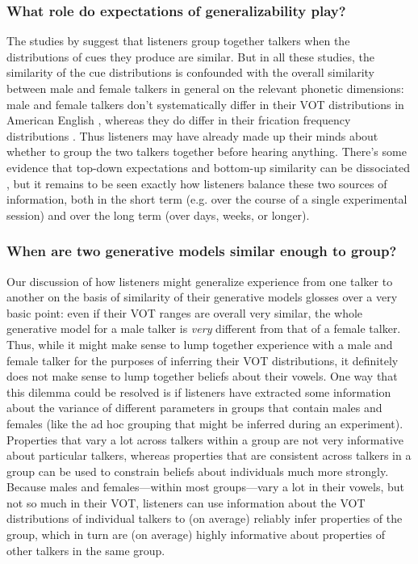 \subsubsection{What role do expectations of generalizability play?}
\label{sec:what-role-expect}

The studies by \textcite{Kraljic2005,Kraljic2006,Kraljic2007} suggest that listeners group together talkers when the distributions of cues they produce are similar.  But in all these studies, the similarity of the cue distributions is confounded with the overall similarity between male and female talkers in general on the relevant phonetic dimensions: male and female talkers don't systematically differ in their VOT distributions in American English \autocite{Allen2003}, whereas they do differ in their frication frequency distributions \autocite{Newman2001}.  Thus listeners may have already made up their minds about whether to group the two talkers together before hearing anything.  There's some evidence that top-down expectations and bottom-up similarity can be dissociated \autocite{Munson2011,Reinisch2014}, but it remains to be seen exactly how listeners balance these two sources of information, both in the short term (e.g. over the course of a single experimental session) and over the long term (over days, weeks, or longer).
\label{r1-reinisch2}

\subsubsection{When are two generative models similar enough to group?}
\label{sec:open-questions}

Our discussion of how listeners might generalize experience from one talker to another on the basis of similarity of their generative models glosses over a very basic point: even if their VOT ranges are overall very similar, the whole generative model for a male talker is \emph{very} different from that of a female talker.  Thus, while it might make sense to lump together experience with a male and female talker for the purposes of inferring their VOT distributions, it definitely does not make sense to lump together beliefs about their vowels.  One way that this dilemma could be resolved is if listeners have extracted some information about the variance of different parameters in groups that contain males and females (like the ad hoc grouping that might be inferred during an experiment).  Properties that vary a lot across talkers within a group are not very informative about particular talkers, whereas properties that are consistent across talkers in a group can be used to constrain beliefs about individuals much more strongly.  Because males and females---within most groups---vary a lot in their vowels, but not so much in their VOT, listeners can use information about the VOT distributions of individual talkers to (on average) reliably infer properties of the group, which in turn are (on average) highly informative about properties of other talkers in the same group.

